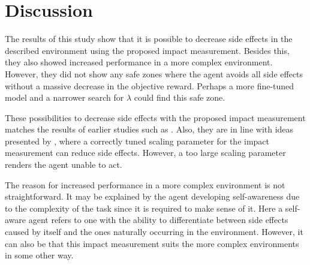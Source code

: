 \documentclass[12pt,A4]{report}
\theoremstyle{definition}
\begin{document}


\chapter{Discussion}
The results of this study show that it is possible to decrease side effects in the described environment using the proposed impact measurement. Besides this, they also showed increased performance in a more complex environment. However, they did not show any safe zones where the agent avoids all side effects without a massive decrease in the objective reward. Perhaps a more fine-tuned model and a narrower search for $\lambda$ could find this safe zone.

These possibilities to decrease side effects with the proposed impact measurement matches the results of earlier studies such as \citet{Turner19,Krakovna19,Krakovna20}. Also, they are in line with ideas presented by \citet{ArmstrongLevinstein}, where a correctly tuned scaling parameter for the impact measurement can reduce side effects. However, a too large scaling parameter renders the agent unable to act. 


The reason for increased performance in a more complex environment is not straightforward. It may be explained by the agent developing self-awareness due to the complexity of the task since it is required to make sense of it. Here a self-aware agent refers to one with the ability to differentiate between side effects caused by itself and the ones naturally occurring in the environment. However, it can also be that this impact measurement suits the more complex environments in some other way. 
\end{document}
